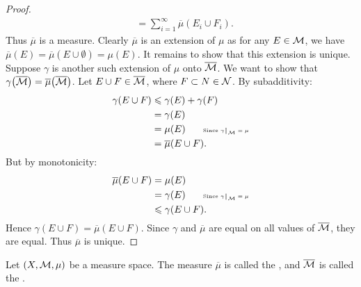 \begin{proof}
\begin{equation*}
\begin{split}
                    & = \sum_{i = 1}^\infty \overline{\mu}(E_i \cup F_i).
                \end{split}
                \end{equation*}
            Thus $\overline{\mu}$ is a measure. Clearly $\overline{\mu}$ is an extension of $\mu$ as for any $E \in \mathcal{M}$, we have $\overline{\mu}(E) = \overline{\mu}(E \cup \emptyset) = \mu(E)$. It remains to show that this extension is unique. Suppose $\gamma$ is another such extension of $\mu$ onto $\overline{\mathcal{M}}$. We want to show that $\gamma \bigl( \overline{\mathcal{M}} \bigr) = \overline{\mu} \bigl( \overline{\mathcal{M}} \bigr)$. Let $E \cup F \in \overline{\mathcal{M}}$, where $F \subset N \in \mathcal{N}$. By subadditivity:
                \begin{equation*}
                \begin{split}
                    \gamma(E \cup F) 
                    & \leq \gamma(E) + \gamma(F) \\
                    & = \gamma(E) \\
                    & = \mu(E) \h9\h9\text{\tiny Since $\restr{\gamma}{\cM} = \mu$}\\
                    & = \overline{\mu}(E \cup F).
                \end{split}
                \end{equation*}
            But by monotonicity:
                \begin{equation*}
                \begin{split}
                    \overline{\mu}(E \cup F) 
                    & = \mu(E) \\
                    & = \gamma(E) \h9\h9\text{\tiny Since $\restr{\gamma}{\cM} = \mu$}\\
                    & \leq \gamma(E \cup F).
                \end{split}
                \end{equation*}
            Hence $\gamma(E \cup F) = \overline{\mu}(E \cup F)$. Since $\gamma$ and $\overline{\mu}$ are equal on all values of $\overline{\mathcal{M}}$, they are equal. Thus $\overline{\mu}$ is unique.
        \end{proof}

    \begin{definition}
        Let $(X,\mathcal{M},\mu)$ be a measure space. The measure $\overline{\mu}$ is called the , and $\overline{\mathcal{M}}$ is called the .
    \end{definition}

